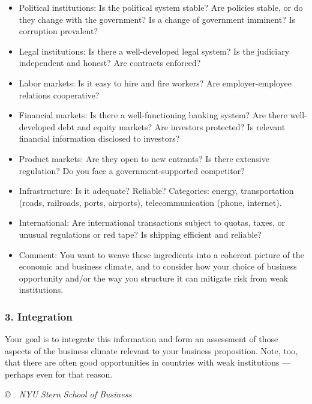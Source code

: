 \documentclass[letterpaper,12pt]{article}
\begin{document}
\begin{itemize}%
\item Political institutions:
    Is the political system stable?
    Are policies stable, or do they change
    with the government?
    Is a change of government imminent?
    Is corruption prevalent?
\item Legal institutions:  Is there a well-developed legal system?  Is the judiciary independent and honest?
    Are contracts enforced?
\item Labor markets:  Is it easy to hire and fire workers?  Are employer-employee relations cooperative?
\item Financial markets:  Is there a well-functioning banking system?  Are there well-developed debt and equity markets?  Are investors protected?  Is relevant financial information disclosed to investors?
\item Product markets:  Are they open to new entrants?  Is there extensive regulation?  Do you face a government-supported competitor?
\item Infrastructure:  Is it adequate?  Reliable?
Categories:  energy, transportation (roads, railroads, ports, airports), telecommunication (phone, internet).
\item International:  Are international transactions subject to quotas, taxes, or unusual regulations or red tape?
Is shipping efficient and reliable?
\item Comment:  You want to weave these ingredients into a coherent picture of the economic and business climate, and to consider how your choice of business opportunity and/or the way you structure it can mitigate risk from weak institutions.
\end{itemize}


\subsubsection*{3. Integration}

Your goal is to integrate this information and form an assessment of those aspects of the business climate relevant to your business proposition.   Note, too, that there are often good opportunities in countries with weak institutions --- perhaps even for that reason.

\vfill \centerline{\it \copyright \ \number\year \ NYU Stern School of Business}
\end{document}

